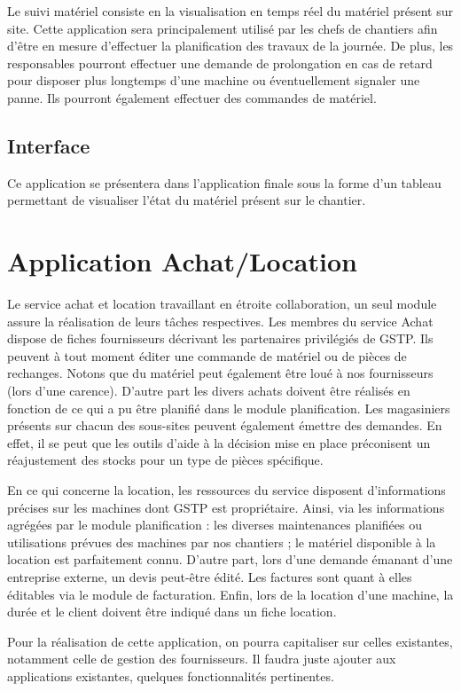         Le suivi matériel consiste en la visualisation en temps réel du matériel présent sur site.  Cette application sera principalement utilisé par les chefs de chantiers afin d'être en mesure d'effectuer la planification des travaux de la journée.
	De plus, les responsables pourront effectuer une demande de prolongation en cas de retard pour disposer plus longtemps d'une machine ou éventuellement signaler une panne. Ils pourront également effectuer des commandes de matériel.

	\subsection {Interface}
	Ce application se présentera dans l'application finale sous la forme d'un tableau permettant de visualiser l'état du matériel présent sur le chantier. 

\section{Application Achat/Location}
	Le service achat et location travaillant en étroite collaboration, un seul module assure la réalisation de leurs tâches respectives. Les membres du service Achat dispose de fiches fournisseurs décrivant les partenaires privilégiés de GSTP. Ils peuvent à tout moment éditer une commande de matériel ou de pièces de rechanges. Notons que du matériel peut également être loué à nos fournisseurs (lors d’une carence). D’autre part les divers achats doivent être réalisés en fonction de ce qui a pu être planifié dans le module planification. 
	Les magasiniers présents sur chacun des sous-sites peuvent également émettre des demandes. En effet, il se peut que les outils d’aide à la décision mise en place préconisent un réajustement des stocks pour un type de pièces spécifique.

	En ce qui concerne la location, les ressources du service disposent d’informations précises sur les machines dont GSTP est propriétaire. Ainsi, via les informations agrégées par le module planification : les diverses maintenances planifiées ou utilisations prévues des machines par nos chantiers ; le matériel disponible à la location est parfaitement connu. 
	D’autre part, lors d’une demande émanant d’une entreprise externe, un devis peut-être édité. Les factures sont quant à elles éditables via le module de facturation. Enfin, lors de la location d’une machine, la durée et le client doivent être indiqué dans un fiche location.

	Pour la réalisation de cette application, on pourra capitaliser sur celles existantes, notamment celle de gestion des fournisseurs. Il faudra juste ajouter aux applications existantes, quelques fonctionnalités pertinentes.

